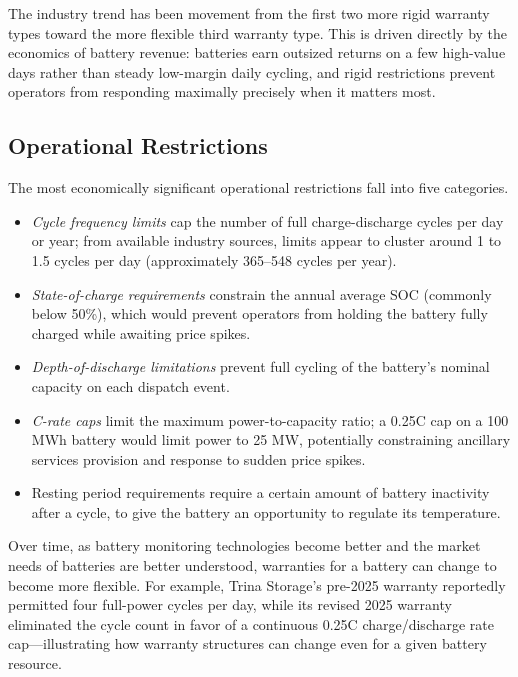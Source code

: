 \documentclass[12pt]{article}
\begin{document}
The industry trend has been movement from the first two more rigid warranty types toward the more flexible third warranty type. This is driven directly by the economics of battery revenue: batteries earn outsized returns on a few high-value days rather than steady low-margin daily cycling, and rigid restrictions prevent operators from responding maximally precisely when it matters most.

\subsection{Operational Restrictions}

The most economically significant operational restrictions fall into five categories. 
\begin{itemize}
    \item \textit{Cycle frequency limits} cap the number of full charge-discharge cycles per day or year; from available industry sources, limits appear to cluster around 1 to 1.5 cycles per day (approximately 365--548 cycles per year).
    \item \textit{State-of-charge requirements} constrain the annual average SOC (commonly below 50\%), which would prevent operators from holding the battery fully charged while awaiting price spikes.
    \item \textit{Depth-of-discharge limitations} prevent full cycling of the battery's nominal capacity on each dispatch event.
    \item \textit{C-rate caps} limit the maximum power-to-capacity ratio; a 0.25C cap on a 100 MWh battery would limit power to 25 MW, potentially constraining ancillary services provision and response to sudden price spikes. 
    \item Resting period requirements require a certain amount of battery inactivity after a cycle, to give the battery an opportunity to regulate its temperature.
\end{itemize}

Over time, as battery monitoring technologies become better and the market needs of batteries are better understood, warranties for a battery can change to become more flexible. For example, Trina Storage's pre-2025 warranty reportedly permitted four full-power cycles per day, while its revised 2025 warranty eliminated the cycle count in favor of a continuous 0.25C charge/discharge rate cap---illustrating how warranty structures can change even for a given battery resource.  

\end{document}
